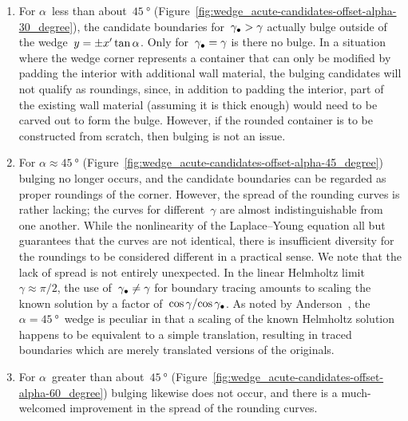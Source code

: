 \begin{enumerate}
  \item
    For $\alpha$~less than about~$\SI{45}{\degree}$
    (Figure~\ref{fig:wedge_acute-candidates-offset-alpha-30_degree}),
    the candidate boundaries for~$\gamma_\bullet > \gamma$
    actually bulge outside of the wedge~$y = \pm x' \tan\alpha$.
    Only for~$\gamma_\bullet = \gamma$ is there no bulge.
    In a situation where the wedge corner represents a container
    that can only be modified by padding the interior
    with additional wall material,
    the bulging candidates will not qualify as roundings,
    since, in addition to padding the interior,
    part of the existing wall material
    (assuming it is thick enough)
    would need to be carved out to form the bulge.
    However, if the rounded container is to be constructed from scratch,
    then bulging is not an issue.
  \item
    For $\alpha \approx \SI{45}{\degree}$
    (Figure~\ref{fig:wedge_acute-candidates-offset-alpha-45_degree})
    bulging no longer occurs,
    and the candidate boundaries can be regarded
    as proper roundings of the corner.
    However, the spread of the rounding curves is rather lacking;
    the curves for different~$\gamma$ are almost indistinguishable
    from one another.
    While the nonlinearity of the Laplace--Young equation all but guarantees
    that the curves are not identical,
    there is insufficient diversity
    for the roundings to be considered different in a practical sense.
    We note that the lack of spread is not entirely unexpected.
    In the linear Helmholtz limit~$\gamma \approx \pi/2$,
    the use of~$\gamma_\bullet \ne \gamma$ for boundary tracing
    amounts to scaling the known solution
    by a factor of~$\cos\gamma / {\cos\gamma_\bullet}$.
    As noted
    by Anderson~\cite[(7.8)]{anderson-2002-thesis-boundary-tracing-pdes},
    the $\alpha = \SI{45}{\degree}$~wedge is peculiar
    in that a scaling of the known Helmholtz solution
    happens to be equivalent to a simple translation,
    resulting in traced boundaries which are merely translated versions
    of the originals.
  \item
    For $\alpha$~greater than about~$\SI{45}{\degree}$
    (Figure~\ref{fig:wedge_acute-candidates-offset-alpha-60_degree})
    bulging likewise does not occur,
    and there is a much-welcomed improvement
    in the spread of the rounding curves.
\end{enumerate}

\begin{figure}
\end{figure}

